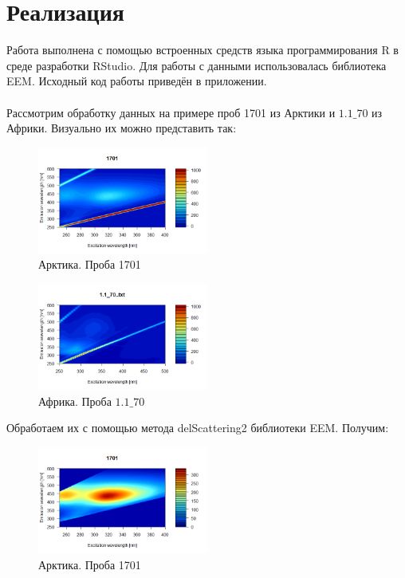 \section{Реализация}
Работа выполнена с помощью встроенных средств языка программирования R в среде разработки RStudio. Для работы с данными использовалась библиотека EEM. Исходный код работы приведён в приложении.\\
\\
Рассмотрим обработку данных на примере проб 1701 из Арктики и $1.1\_70$ из Африки. Визуально их можно представить так:
\begin{figure}[!htb]
    \centering
    \includegraphics[width=0.5\textwidth]{fig/Arctic_1.png}
    \caption{Арктика. Проба 1701}
\end{figure}
\begin{figure}[!htb]
    \centering
    \includegraphics[width=0.5\textwidth]{fig/Africa_1.png}
    \caption{Африка. Проба $1.1\_70$}
\end{figure}
\newpage
Обработаем их с помощью метода delScattering2 библиотеки EEM. Получим:
\begin{figure}[!htb]
    \centering
    \includegraphics[width=0.5\textwidth]{fig/Arctic_2.png}
    \caption{Арктика. Проба 1701}
\end{figure}

